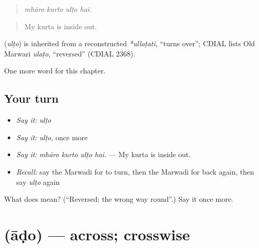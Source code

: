 \begin{quote}
   
\end{quote}

\begin{quote}
\emph{mhāro kurto ulṭo hai.}
\end{quote}

\begin{quote}
My kurta is inside out.
\end{quote}

\begin{cousinweb}
\textbf{} (\emph{ulṭo}) is inherited from a reconstructed \emph{*ullaṭati}, \textquotedblleft{}turns over\textquotedblright{}; CDIAL lists Old Marwari \emph{ulaṭo}, \textquotedblleft{}reversed\textquotedblright{} (CDIAL 2368).
\end{cousinweb}

\begin{grammarlens}[title={What you've built}]
One more word for this chapter.
\end{grammarlens}

\subsection*{Your turn}
\begin{itemize}
\raggedright
  \item \emph{Say it:} \emph{ulṭo}
  \item \emph{Say it:} \emph{ulṭo}, once more
  \item \emph{Say it:} \emph{mhāro kurto ulṭo hai.} — My kurta is inside out.
  \item \emph{Recall:} say the Marwadi for to turn, then the Marwadi for back again, then say \emph{ulṭo} again
\end{itemize}

\begin{tcolorbox}[breakable,colback=teal!4,colframe=teal!35!black,title={Before you move on}]
What does  mean? (\textquotedblleft{}Reversed; the wrong way round\textquotedblright{}.) Say it once more.
\end{tcolorbox}
\section[\texorpdfstring{\mw{आडो} (āḍo)}{आडो (āḍo)}]{ (āḍo) — across; crosswise}

\label{lesson:MW-C202-ado}



